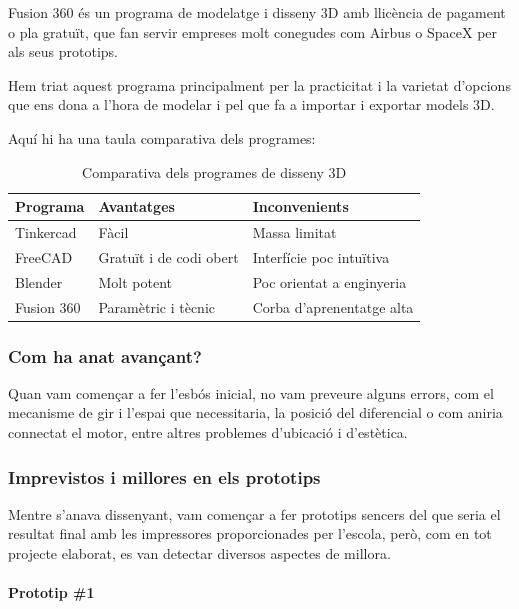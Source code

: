 \documentclass[11pt,a4paper]{article}
\begin{document}
Fusion 360 és un programa de modelatge i disseny 3D amb llicència de pagament o pla gratuït, que fan servir empreses molt conegudes com Airbus o SpaceX per als seus prototips.

Hem triat aquest programa principalment per la practicitat i la varietat d’opcions que ens dona a l’hora de modelar i pel que fa a importar i exportar models 3D.

Aquí hi ha una taula comparativa dels programes:

\begin{table}[H]
  \centering
  \caption{Comparativa dels programes de disseny 3D}\label{taula-2}
  \begin{tabular}{lll}
    \toprule
    \textbf{Programa} & \textbf{Avantatges} & \textbf{Inconvenients} \\
    \midrule
    Tinkercad & Fàcil & Massa limitat \\
    FreeCAD & Gratuït i de codi obert & Interfície poc intuïtiva \\
    Blender & Molt potent & Poc orientat a enginyeria \\
    Fusion 360 & Paramètric i tècnic & Corba d’aprenentatge alta \\
    \bottomrule
  \end{tabular}
\end{table}

\subsubsection{Com ha anat avançant?}

Quan vam començar a fer l’esbós inicial, no vam preveure alguns errors, com el mecanisme de gir i l’espai que necessitaria, la posició del diferencial o com aniria connectat el motor, entre altres problemes d’ubicació i d’estètica.

\subsubsection{Imprevistos i millores en els prototips}

Mentre s’anava dissenyant, vam començar a fer prototips sencers del que seria el resultat final amb les impressores proporcionades per l’escola, però, com en tot projecte elaborat, es van detectar diversos aspectes de millora.

\paragraph*{Prototip \#1}
\end{document}
